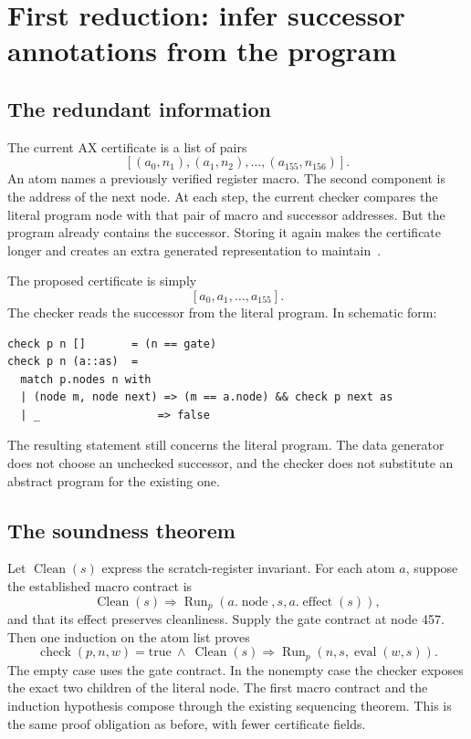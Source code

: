 \documentclass[11pt,letterpaper]{article}
\theoremstyle{definition}\newtheorem{definition}[theorem]{Definition}
\begin{document}
\section{First reduction: infer successor annotations from the program}

\subsection{The redundant information}

The current AX certificate is a list of pairs
\[
 [(a_0,n_1),(a_1,n_2),\ldots,(a_{155},n_{156})].
\]
An atom names a previously verified register macro. The second component is the
address of the next node. At each step, the current checker compares the literal
program node with that pair of macro and successor addresses. But the program
already contains the successor. Storing it again makes the certificate longer and
creates an extra generated representation to maintain~\cite{axioms}.

The proposed certificate is simply
\[
 [a_0,a_1,\ldots,a_{155}].
\]
The checker reads the successor from the literal program. In schematic form:
\begin{lstlisting}
check p n []       = (n == gate)
check p n (a::as)  =
  match p.nodes n with
  | (node m, node next) => (m == a.node) && check p next as
  | _                  => false
\end{lstlisting}
The resulting statement still concerns the literal program. The data generator
does not choose an unchecked successor, and the checker does not substitute an
abstract program for the existing one.

\subsection{The soundness theorem}

Let $\operatorname{Clean}(s)$ express the scratch-register invariant. For each
atom $a$, suppose the established macro contract is
\[
 \operatorname{Clean}(s)\Longrightarrow
 \operatorname{Run}_{p}(a.\operatorname{node},s,a.\operatorname{effect}(s)),
\]
and that its effect preserves cleanliness. Supply the gate contract at node 457.
Then one induction on the atom list proves
\[
 \operatorname{check}(p,n,w)=\mathrm{true}\ \land\ \operatorname{Clean}(s)
 \Longrightarrow
 \operatorname{Run}_{p}(n,s,\operatorname{eval}(w,s)).
\]
The empty case uses the gate contract. In the nonempty case the checker exposes
the exact two children of the literal node. The first macro contract and the
induction hypothesis compose through the existing sequencing theorem. This is
the same proof obligation as before, with fewer certificate fields.
\end{document}
